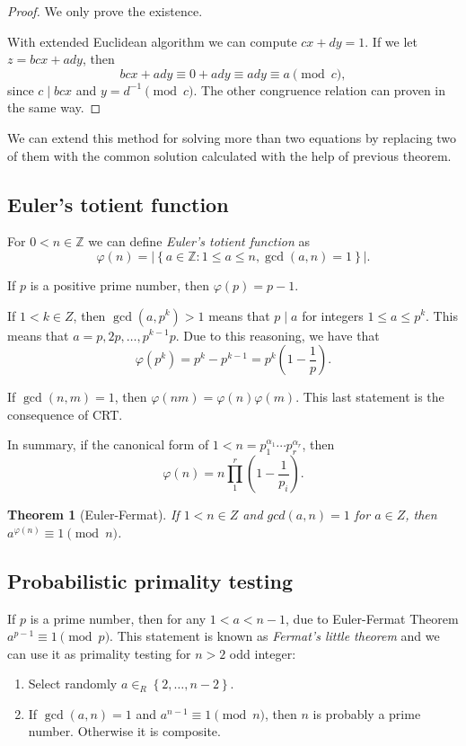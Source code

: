 \documentclass{article}
\newcommand{\Z}{\mathbb{Z}}
\newtheorem{theorem}{Theorem}
\begin{document}
\begin{proof}
    We only prove the existence.

    With extended Euclidean algorithm we can compute $cx + dy = 1$.
    If we let $z = bcx + ady$, then
    \[
        bcx + ady \equiv 0 + ady \equiv ady \equiv a \pmod{c},
    \]
    since $c \mid bcx$ and $y=d^{-1} \pmod{c}$.
    The other congruence relation can proven in the same way.
\end{proof}

We can extend this method for solving more than two equations by replacing two of them with the common solution calculated with the help of previous theorem.

\subsection{Euler's totient function}

For $0 < n \in \Z$ we can define \emph{Euler's totient function} as
\[
    \varphi(n)  = \left \lvert \left \{ a \in \Z : 1 \le a \le n, \gcd(a,n) = 1 \right \} \right \rvert.
\]

If $p$ is a positive prime number, then $\varphi(p) = p - 1$.

If $1 < k \in Z$, then $\gcd(a, p^k) > 1$ means that $p \mid a$ for integers $1 \le a \le p^k$.
This means that $a = p, 2p, \dots, p^{k-1}p$. Due to this reasoning, we have that
\[
    \varphi\left( p^k \right) = p^k - p^{k-1} = p^k \left( 1 - \frac{1}{p} \right).
\]

If $\gcd(n,m)=1$, then $\varphi(nm) = \varphi(n)\varphi(m)$. This last statement is the consequence of CRT.

In summary, if the canonical form of $1 < n = p_1^{\alpha_1}\cdots p_r^{\alpha_r}$, then
\[
    \varphi(n) = n \prod_{1}^{r} \left( 1 - \frac{1}{p_i} \right).
\]

\begin{theorem}[Euler-Fermat]
    If $1 < n \in Z$ and $gcd(a,n) = 1$ for $a \in Z$, then $a^{\varphi(n)} \equiv 1 \pmod{n}$.
\end{theorem}

\subsection{Probabilistic primality testing}

If $p$ is a prime number, then for any $1 < a < n-1$, due to Euler-Fermat Theorem $a^{p-1} \equiv 1 \pmod{p}$.
This statement is known as \emph{Fermat's little theorem} and we can use it as primality testing for $n > 2$ odd integer:
\begin{enumerate}
    \item Select randomly $a \in_R \left \{ 2, \ldots, n-2 \right \}$.
    \item If $\gcd(a,n)=1$ and $a^{n-1} \equiv 1 \pmod{n}$, then $n$ is probably a prime number. Otherwise it is composite.
\end{enumerate}
\end{document}
